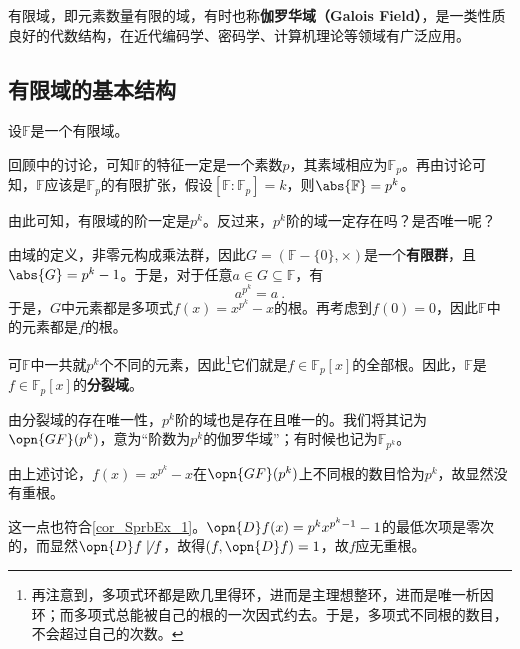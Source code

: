 


有限域，即元素数量有限的域，有时也称\textbf{伽罗华域（Galois Field）}，是一类性质良好的代数结构，在近代编码学、密码学、计算机理论等领域有广泛应用。

\subsection{有限域的基本结构}

设$\mathbb{F}$是一个有限域。

回顾中的讨论，可知$\mathbb{F}$的特征一定是一个素数$p$，其素域相应为$\mathbb{F}_p$。再由讨论可知，$\mathbb{F}$应该是$\mathbb{F}_p$的有限扩张，假设$[\mathbb{F}:\mathbb{F}_p]=k$，则$\abs{\mathbb{F}}=p^k$。

由此可知，有限域的阶一定是$p^k$。反过来，$p^k$阶的域一定存在吗？是否唯一呢？

由域的定义，非零元构成乘法群，因此$G=(\mathbb{F}-\{0\}, \times)$是一个\textbf{有限群}，且$\abs{G}=p^k-1$。于是，对于任意$a\in G\subseteq\mathbb{F}$，有
\begin{equation}
a^{p^k}=a~.
\end{equation}
于是，$G$中元素都是多项式$f(x)=x^{p^k}-x$的根。再考虑到$f(0)=0$，因此$\mathbb{F}$中的元素都是$f$的根。

可$\mathbb{F}$中一共就$p^k$个不同的元素，因此\footnote{再注意到，多项式环都是欧几里得环，进而是主理想整环，进而是唯一析因环；而多项式总能被自己的根的一次因式约去。于是，多项式不同根的数目，不会超过自己的次数。}它们就是$f\in\mathbb{F}_p[x]$的全部根。因此，$\mathbb{F}$是$f\in\mathbb{F}_p[x]$的\textbf{分裂域}。

由分裂域的存在唯一性，$p^k$阶的域也是存在且唯一的。我们将其记为$\opn{GF}(p^k)$，意为“阶数为$p^k$的伽罗华域”；有时候也记为$\mathbb{F}_{p^k}$。

\begin{example}{}
由上述讨论，$f(x)=x^{p^k}-x$在$\opn{GF}(p^k)$上不同根的数目恰为$p^k$，故显然没有重根。

这一点也符合\autoref{cor_SprbEx_1}。$\opn{D}f(x)=p^kx^{p^k-1}-1$的最低次项是零次的，而显然$\opn{D}f\not\mid f$，故得$(f, \opn{D}f)=1$，故$f$应无重根。
\end{example}



